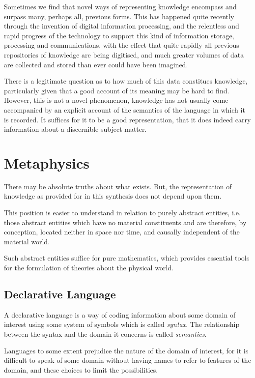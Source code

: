 Sometimes we find that novel ways of representing knowledge encompass and surpass many, perhaps all, previous forms.
This has happened quite recently through the invention of digital information processing, and the relentless and rapid progress of the technology to support this kind of information storage, processing and communications, with the effect that quite rapidly all previous repositories of knowledge are being digitised, and much greater volumes of data are collected and stored than ever could have been imagined.

There is a legitimate question as to how much of this data constitues knowledge, particularly given that a good account of its meaning may be hard to find.
However, this is not a novel phenomenon, knowledge has not usually come accompanied by an explicit account of the semantics of the language in which it is recorded.
It suffices for it to be a good representation, that it does indeed carry information about a discernible subject matter.

\section{Metaphysics}


There may be absolute truths about what exists.
But, the representation of knowledge as provided for in this synthesis does not depend upon them.

This position is easier to understand in relation to purely abstract entities, i.e. those abstract entities which have no material constituents and are therefore, by conception, located neither in space nor time, and causally independent of the material world.

Such abstract entities suffice for pure mathematics, which provides essential tools for the formulation of theories about the physical world.

\subsection{Declarative Language}

A declarative language is a way of coding information about some domain of interest using some system of symbols which is called \emph{syntax}.
The relationship between the syntax and the domain it concerns is called \emph{semantics}.

Languages to some extent prejudice the nature of the domain of interest, for it is difficult to speak of some domain without having names to refer to features of the domain, and these choices to limit the possibilities.

